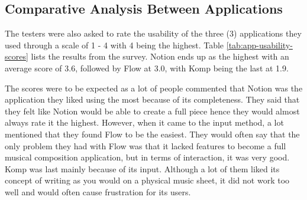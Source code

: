 		\subsection{Comparative Analysis Between Applications}

			The testers were also asked to rate the usability of the three (3) applications they used through a scale of 1 - 4 with 4 being the highest. Table \ref{tab:app-usability-scores} lists the results from the survey. Notion ends up as the highest with an average score of 3.6, followed by Flow at 3.0, with Komp being the last at 1.9.

			The scores were to be expected as a lot of people commented that Notion was the application they liked using the most because of its completeness. They said that they felt like Notion would be able to create a full piece hence they would almost always rate it the highest. However, when it came to the input method, a lot mentioned that they found Flow to be the easiest. They would often say that the only problem they had with Flow was that it lacked features to become a full musical composition application, but in terms of interaction, it was very good. Komp was last mainly because of its input. Although a lot of them liked its concept of writing as you would on a physical music sheet, it did not work too well and would often cause frustration for its users. 


